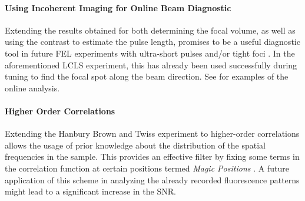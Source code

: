 \paragraph{Using Incoherent Imaging for Online Beam Diagnostic}
Extending the results obtained for both determining the focal volume, as well as using the contrast to estimate the pulse length, promises to be a useful diagnostic tool in future FEL experiments with ultra-short pulses and/or tight foci \cite{nakumura2020,inoue2019}. In the aforementioned LCLS experiment, this has already been used successfully during tuning to find the focal spot along the beam direction. See  for examples of the online analysis.

\paragraph{Higher Order Correlations}
Extending the Hanbury Brown and Twiss experiment to higher-order correlations allows the usage of prior knowledge about the distribution of the spatial frequencies in the sample. This provides an effective filter by fixing some terms in the correlation function at certain positions termed \textit{Magic Positions} \cite{schneider2018,thiel2007}. A future application of this scheme in analyzing the already recorded fluorescence patterns might lead to a significant increase in the SNR.

